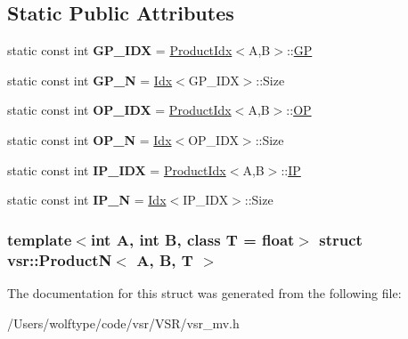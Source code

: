 \subsection*{Static Public Attributes}
\begin{DoxyCompactItemize}
\item 
\hypertarget{structvsr_1_1_product_n_a74cb5ee66301329f27170885b69ceaa5}{static const int {\bfseries G\-P\-\_\-\-I\-D\-X} = \hyperlink{structvsr_1_1_product_idx}{Product\-Idx}$<$A,B$>$\-::\hyperlink{classvsr_1_1_m_v}{G\-P}}\label{structvsr_1_1_product_n_a74cb5ee66301329f27170885b69ceaa5}

\item 
\hypertarget{structvsr_1_1_product_n_a4fd5d2cbab2b44a908345fb6e21113aa}{static const int {\bfseries G\-P\-\_\-\-N} = \hyperlink{structvsr_1_1_idx}{Idx}$<$G\-P\-\_\-\-I\-D\-X$>$\-::Size}\label{structvsr_1_1_product_n_a4fd5d2cbab2b44a908345fb6e21113aa}

\item 
\hypertarget{structvsr_1_1_product_n_a3f3f41523f08ade0f8dd496731353a99}{static const int {\bfseries O\-P\-\_\-\-I\-D\-X} = \hyperlink{structvsr_1_1_product_idx}{Product\-Idx}$<$A,B$>$\-::\hyperlink{classvsr_1_1_m_v}{O\-P}}\label{structvsr_1_1_product_n_a3f3f41523f08ade0f8dd496731353a99}

\item 
\hypertarget{structvsr_1_1_product_n_aa7d685adde94c22bea9559c6029f361f}{static const int {\bfseries O\-P\-\_\-\-N} = \hyperlink{structvsr_1_1_idx}{Idx}$<$O\-P\-\_\-\-I\-D\-X$>$\-::Size}\label{structvsr_1_1_product_n_aa7d685adde94c22bea9559c6029f361f}

\item 
\hypertarget{structvsr_1_1_product_n_a6eae0fd51415aac4d2a0f0aaa50a14ec}{static const int {\bfseries I\-P\-\_\-\-I\-D\-X} = \hyperlink{structvsr_1_1_product_idx}{Product\-Idx}$<$A,B$>$\-::\hyperlink{classvsr_1_1_m_v}{I\-P}}\label{structvsr_1_1_product_n_a6eae0fd51415aac4d2a0f0aaa50a14ec}

\item 
\hypertarget{structvsr_1_1_product_n_a1ccb37f3063835130003a89fecc759db}{static const int {\bfseries I\-P\-\_\-\-N} = \hyperlink{structvsr_1_1_idx}{Idx}$<$I\-P\-\_\-\-I\-D\-X$>$\-::Size}\label{structvsr_1_1_product_n_a1ccb37f3063835130003a89fecc759db}

\end{DoxyCompactItemize}
\subsubsection*{template$<$int A, int B, class T = float$>$ struct vsr\-::\-Product\-N$<$ A, B, T $>$}



The documentation for this struct was generated from the following file\-:\begin{DoxyCompactItemize}
\item 
/\-Users/wolftype/code/vsr/\-V\-S\-R/vsr\-\_\-mv.\-h\end{DoxyCompactItemize}
